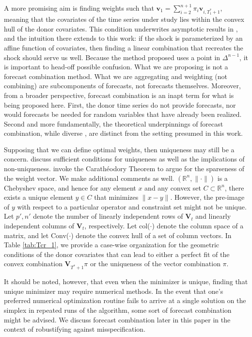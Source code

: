 \documentclass{uiucthesis2021}
\newcommand{\weight}{\pi}
\newcommand{\V}{\textbf{V}}
\theoremstyle{definition}
\begin{document}
A more promising aim is finding weights such that $\textbf{v}_{1} = \sum^{n+1}_{i=2}\weight_{i}\textbf{v}_{i,T_{1}^{*}+1}$, meaning that the covariates of the time series under study lies within the convex hull of the donor covariates.  This condition underwrites asymptotic results in \cite[][]{abadie2010synthetic}, and the intuition there extends to this work: if the shock is parameterized by an affine function of covariates, then finding a linear combination that recreates the shock should serve us well.  Because the method proposed uses a point in $\Delta^{n-1}$, it is important to head-off possible confusion.  What we are proposing is not a forecast combination method.  What we are aggregating and weighting (not combining) are subcomponents of forecasts, not forecasts themselves.  Moreover, from a broader perspective, forecast combination is an inapt term for what is being proposed here.  First, the donor time series do not provide forecasts, nor would forecasts be needed for random variables that have already been realized.  Second and more fundamentally, the theoretical underpinnings of forecast combination, while diverse \cite[][]{wang2023forecast}, are distinct from the setting presumed in this work.

Supposing that we can define optimal weights, then uniqueness may still be a concern. \cite[][]{lin2021minimizing} discuss sufficient conditions for uniqueness as well as the implications of non-uniqueness.  \cite[][]{abadie2022synthetic} invoke the Carath\'eodory Theorem to argue for the sparseness of the weight vector.  We make additional comments as well. $(\mathbb{R}^{n}, \|\cdot\|)$ is a Chebyshev space, and hence for any element $x$ and any convex set $C\subset \mathbb{R}^{n}$, there exists a unique element $y\in C$ that minimizes $\|x-y\|$.  However, the pre-image of $y$ with respect to a particular operator and constraint set might not be unique.  Let $p', n'$ denote the number of linearly independent rows of $\V_{t}$ and linearly independent columns of $\V_{t}$, respectively.  Let col($\cdot$) denote the column space of a matrix, and let Conv($\cdot$) denote the convex hull of a set of column vectors. In Table \ref{tab:Tcr_1}, we provide a case-wise organization for the geometric conditions of the donor covariates that can lead to either a perfect fit of the convex combination $\V_{T^* + 1}\pi$ or the uniqueness of the vector combination $\pi$.  

It should be noted, however, that even when the minimizer is unique, finding that unique minimizer may require numerical methods.  In the event that one's preferred numerical optimization routine fails to arrive at a single solution on the simplex in repeated runs of the algorithm, some sort of forecast combination might be advised.  We discuss forecast combination later in this paper in the context of robustifying against misspecification.
\end{document}
